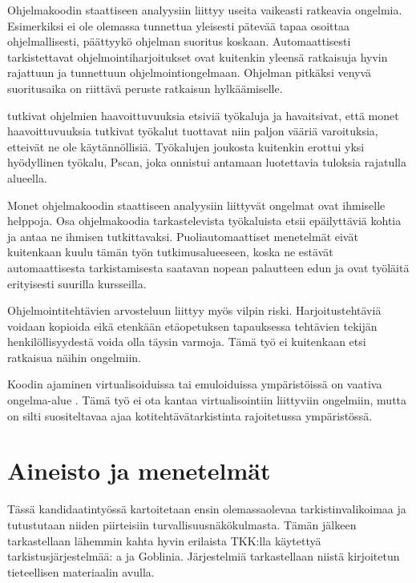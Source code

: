 Ohjelmakoodin staattiseen analyysiin liittyy useita vaikeasti ratkeavia
ongelmia. Esimerkiksi ei ole olemassa tunnettua yleisesti pätevää
tapaa osoittaa ohjelmallisesti, päättyykö ohjelman suoritus koskaan.
Automaattisesti tarkistettavat ohjelmointiharjoitukset ovat kuitenkin yleensä
ratkaisuja hyvin rajattuun ja tunnettuun ohjelmointiongelmaan. Ohjelman pitkäksi
venyvä suoritusaika on riittävä peruste ratkaisun hylkäämiselle.

\citet{heffley2004can} tutkivat ohjelmien haavoittuvuuksia etsiviä työkaluja
ja havaitsivat, että monet haavoittuvuuksia tutkivat työkalut tuottavat niin
paljon vääriä varoituksia, etteivät ne ole käytännöllisiä. Työkalujen joukosta
kuitenkin erottui yksi hyödyllinen työkalu, Pscan, joka onnistui antamaan
luotettavia tuloksia rajatulla alueella. 

Monet ohjelmakoodin staattiseen analyysiin liittyvät ongelmat ovat ihmiselle
helppoja. Osa ohjelmakoodia tarkastelevista työkaluista etsii epäilyttäviä
kohtia ja antaa ne ihmisen tutkittavaksi. \citep{taft2008systematic} Puoliautomaattiset
menetelmät eivät kuitenkaan kuulu tämän työn tutkimusalueeseen, koska ne
estävät automaattisesta tarkistamisesta saatavan nopean palautteen edun ja
ovat työläitä erityisesti suurilla kursseilla.

Ohjelmointitehtävien arvosteluun liittyy myös vilpin riski. Harjoitustehtäviä
voidaan kopioida eikä etenkään etäopetuksen tapauksessa tehtävien tekijän
henkilöllisyydestä voida olla täysin varmoja. Tämä työ ei kuitenkaan etsi
ratkaisua näihin ongelmiin.

Koodin ajaminen virtualisoiduissa tai emuloiduissa ympäristöissä on vaativa
ongelma-alue \citep{kesti2010}. Tämä työ ei ota kantaa virtualisointiin
liittyviin ongelmiin, mutta on silti suositeltavaa ajaa kotitehtävätarkistinta
rajoitetussa ympäristössä.


\section{Aineisto ja menetelmät}
\label{sec:aineisto}

Tässä kandidaatintyössä kartoitetaan ensin olemassaolevaa tarkistinvalikoimaa
ja tutustutaan niiden piirteisiin turvallisuusnäkökulmasta. Tämän 
jälkeen tarkastellaan lähemmin kahta hyvin erilaista TKK:lla käytettyä 
tarkistusjärjestelmää: {\scmrobo}a ja Goblinia. Järjestelmiä tarkastellaan
niistä kirjoitetun tieteellisen materiaalin avulla.

